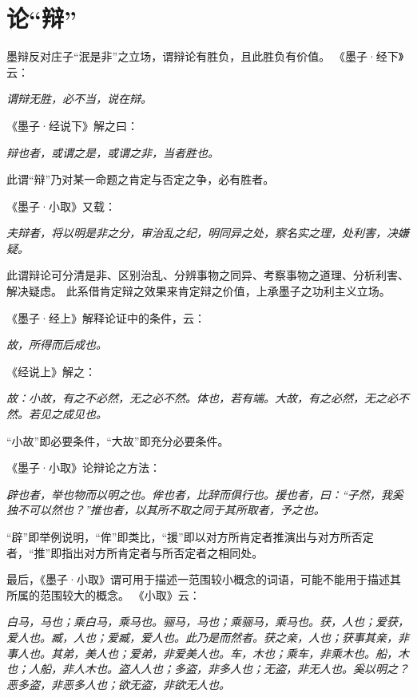 \documentclass[11pt]{article}
\begin{document}
\section{论“辩”}
墨辩反对庄子“泯是非”之立场，谓辩论有胜负，且此胜负有价值。
《墨子·经下》云：

\textit{谓辩无胜，必不当，说在辩。}

《墨子·经说下》解之曰：

\textit{辩也者，或谓之是，或谓之非，当者胜也。}

此谓“辩”乃对某一命题之肯定与否定之争，必有胜者。

\par

《墨子·小取》又载：

\textit{夫辩者，将以明是非之分，审治乱之纪，明同异之处，察名实之理，处利害，决嫌疑。}

此谓辩论可分清是非、区别治乱、分辨事物之同异、考察事物之道理、分析利害、解决疑虑。
此系借肯定辩之效果来肯定辩之价值，上承墨子之功利主义立场。

\par

《墨子·经上》解释论证中的条件，云：

\textit{故，所得而后成也。}

《经说上》解之：

\textit{故：小故，有之不必然，无之必不然。体也，若有端。大故，有之必然，无之必不然。若见之成见也。}

“小故”即必要条件，“大故”即充分必要条件。

\par

《墨子·小取》论辩论之方法：

\textit{辟也者，举也物而以明之也。侔也者，比辞而俱行也。援也者，曰：“子然，我奚独不可以然也？”推也者，以其所不取之同于其所取者，予之也。}

“辟”即举例说明，“侔”即类比，“援”即以对方所肯定者推演出与对方所否定者，“推”即指出对方所肯定者与所否定者之相同处。

\par

最后，《墨子·小取》谓可用于描述一范围较小概念的词语，可能不能用于描述其所属的范围较大的概念。
《小取》云：

\textit{白马，马也；乘白马，乘马也。骊马，马也；乘骊马，乘马也。获，人也；爱获，爱人也。臧，人也；爱臧，爱人也。此乃是而然者。获之亲，人也；获事其亲，非事人也。其弟，美人也；爱弟，非爱美人也。车，木也；乘车，非乘木也。船，木也；人船，非人木也。盗人人也；多盗，非多人也；无盗，非无人也。奚以明之？恶多盗，非恶多人也；欲无盗，非欲无人也。}
\end{document}
